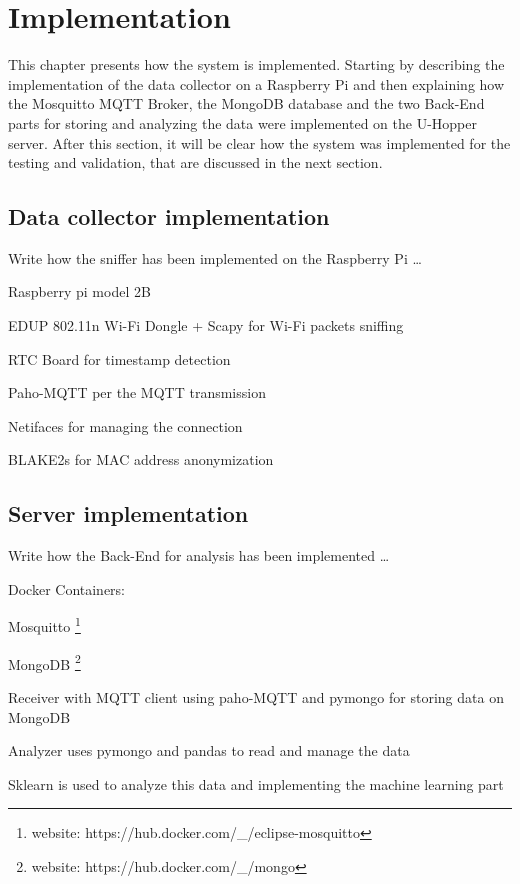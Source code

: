 \chapter{Implementation}
\label{cha:implementation}
\vspace{0.4 cm} 

This chapter presents how the system is implemented.
Starting by describing the implementation of the data collector on a Raspberry Pi and then explaining how the Mosquitto MQTT Broker, the MongoDB database and the two Back-End parts for storing and analyzing the data were implemented on the U-Hopper server. After this section, it will be clear how the system was implemented for the testing and validation, that are discussed in the next section.


\section{Data collector implementation}
\label{sec:collector}
\vspace{0.2 cm} 

Write how the sniffer has been implemented on the Raspberry Pi \dots

Raspberry pi model 2B

EDUP 802.11n Wi-Fi Dongle + Scapy for Wi-Fi packets sniffing

RTC Board for timestamp detection

Paho-MQTT per the MQTT transmission

Netifaces for managing the connection

BLAKE2s for MAC address anonymization





\section{Server implementation}
\label{sec:server}
\vspace{0.2 cm} 

Write how the Back-End for analysis has been implemented \dots

Docker Containers:

Mosquitto \footnote{ website: https://hub.docker.com/\_/eclipse-mosquitto }

MongoDB \footnote{ website: https://hub.docker.com/\_/mongo }

Receiver with MQTT client using paho-MQTT and pymongo for storing data on MongoDB

Analyzer uses pymongo and pandas to read and manage the data

Sklearn is used to analyze this data and implementing the machine learning part
